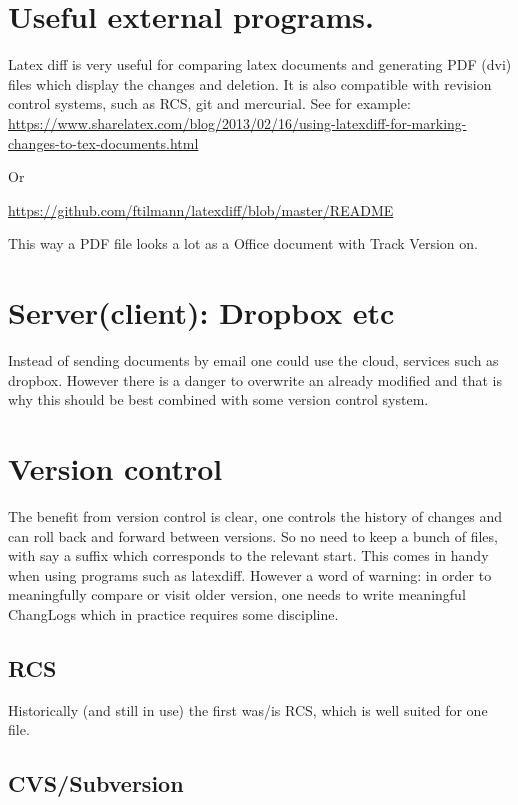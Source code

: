 \documentclass[11pt]{article}
\begin{document}
\section{Useful external programs.}
\label{sec:orgheadline3}

Latex diff is very useful for comparing latex documents and generating
PDF (dvi) files which  display the changes and deletion. It is also
compatible with revision control systems, such as RCS, git and
mercurial. See for example:
\url{https://www.sharelatex.com/blog/2013/02/16/using-latexdiff-for-marking-changes-to-tex-documents.html}

Or 

\url{https://github.com/ftilmann/latexdiff/blob/master/README}

This way a PDF file looks a lot as a Office document with Track
Version on.

\section{Server(client): Dropbox etc}
\label{sec:orgheadline4}

Instead of sending documents by email one could use the cloud,
services such as dropbox. However there is a danger to overwrite an
already modified and that is why this should be best combined with
some version control system.



\section{Version control}
\label{sec:orgheadline14}

The benefit from version control is clear, one controls the history of
changes and can roll back and forward between versions. So no need to
keep a bunch of files, with say a suffix which corresponds to the
relevant start. This comes in handy when using programs such as
latexdiff. However a word of warning: in order to meaningfully compare
or visit older version, one needs to write meaningful ChangLogs which
in practice requires some discipline.
\subsection{RCS}
\label{sec:orgheadline5}
Historically (and still in use) the first was/is RCS, which is well
suited for one file. 
\subsection{CVS/Subversion}
\label{sec:orgheadline6}
\end{document}
